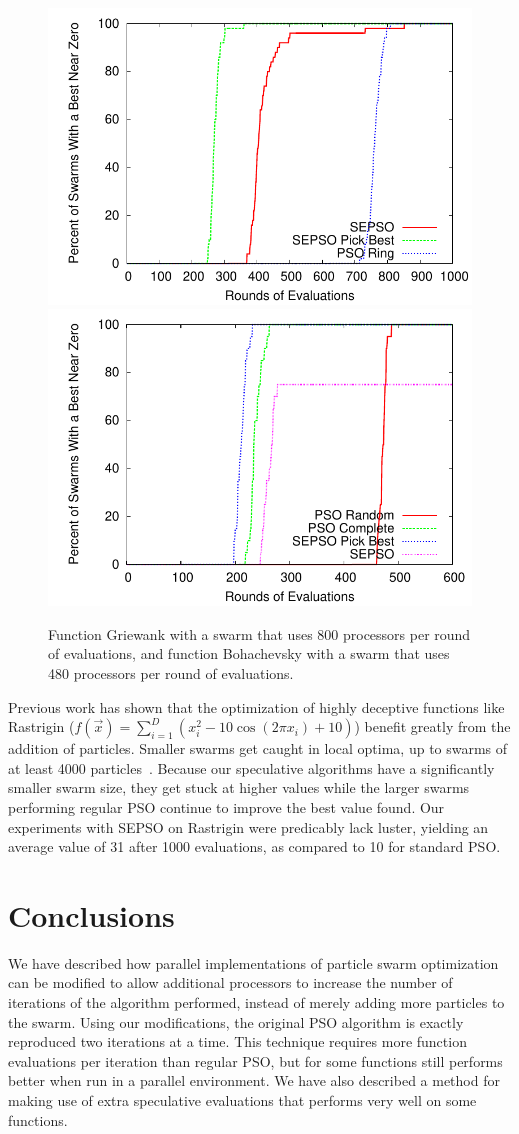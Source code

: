 \documentclass{llncs}
\begin{document}
\begin{figure}
  \centering
  \includegraphics[width=.45\columnwidth]{griewank}
  \includegraphics[width=.45\columnwidth]{bohachevsky}
  \caption{Function Griewank with a swarm that uses 800 processors per round of
  evaluations, and function Bohachevsky with a swarm that uses 480 processors
  per round of evaluations.}
  \label{fig:griewank}
\end{figure}

Previous work has shown that the optimization of highly deceptive functions
like Rastrigin ($f(\Vec{x}) = \sum_{i=1}^D \left(x_i^2 - 10\cos\left(2\pi
x_i\right) + 10\right)$) benefit greatly from the addition of particles.
Smaller swarms get caught in local optima, up to swarms of at least 4000
particles~\cite{mcnabb-2009-large-particle-swarms}.  Because our speculative
algorithms have a significantly smaller swarm size, they get stuck at higher
values while the larger swarms performing regular PSO continue to improve the
best value found.  Our experiments with SEPSO on Rastrigin were predicably lack
luster, yielding an average value of 31 after 1000 evaluations, as compared to
10 for standard PSO.

\section{Conclusions}
\label{sec:conclusion}

We have described how parallel implementations of particle swarm optimization
can be modified to allow additional processors to increase the number of
iterations of the algorithm performed, instead of merely adding more particles
to the swarm.  Using our modifications, the original PSO algorithm is exactly
reproduced two iterations at a time.  This technique requires more function
evaluations per iteration than regular PSO, but for some functions still
performs better when run in a parallel environment.  We have also described a
method for making use of extra speculative evaluations that performs very well
on some functions.
\end{document}

